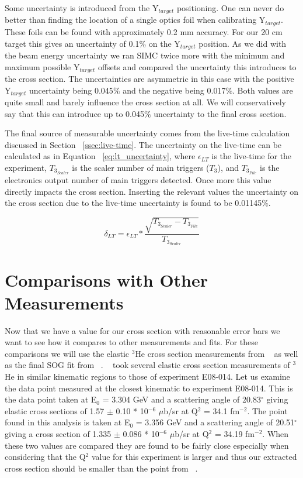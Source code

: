 Some uncertainty is introduced from the Y$_{target}$ positioning. One can never do better than finding the location of a single optics foil when calibrating Y$_{target}$. These foils can be found with approximately 0.2 mm accuracy. For our 20 cm target this gives an uncertainty of 0.1$\%$ on the Y$_{target}$ position. As we did with the beam energy uncertainty we ran SIMC twice more with the minimum and maximum possible Y$_{target}$ offsets and compared the uncertainty this introduces to the cross section. The uncertainties are asymmetric in this case with the positive Y$_{target}$ uncertainty being 0.045$\%$ and the negative being 0.017$\%$. Both values are quite small and barely influence the cross section at all. We will conservatively say that this can introduce up to 0.045$\%$ uncertainty to the final cross section. 

The final source of measurable uncertainty comes from the live-time calculation discussed in Section ~\ref{ssec:live-time}. The uncertainty on the live-time can be calculated as in Equation ~\ref{eq:lt_uncertainty}, where $\epsilon_{LT}$ is the live-time for the experiment, $T_{3_{Scaler}}$ is the scaler number of main triggers ($T_3$), and $T_{3_{File}}$ is the electronics output number of main triggers detected. Once more this value directly impacts the cross section. Inserting the relevant values the uncertainty on the cross section due to the live-time uncertainty is found to be 0.01145$\%$.

\begin{equation} \label{eq:lt_uncertainty}
	\delta_{LT} = \epsilon_{LT} * \frac{\sqrt{T_{3_{Scaler}}-T_{3_{File}}}}{T_{3_{Scaler}}}
\end{equation}

\section{Comparisons with Other Measurements}
\label{sec:comparisons}

Now that we have a value for our cross section with reasonable error bars we want to see how it compares to other measurements and fits. For these comparisons we will use the elastic $^3$He cross section measurements from ~\cite{Article:Alex} as well as the final SOG fit from ~\cite{Article:Amroun}. ~\cite{Article:Alex} took several elastic cross section measurements of $^3$He in similar kinematic regions to those of experiment E08-014. Let us examine the data point measured at the closest kinematic to experiment E08-014. This is the data point taken at E$_0$ = 3.304 GeV and a scattering angle of 20.83$^{\circ}$ giving elastic cross sections of 1.57 $\pm$ 0.10 * 10$^{-6}$ $\mu$b/sr at Q$^2$ = 34.1 fm$^{-2}$. The point found in this analysis is taken at E$_0$ = 3.356 GeV and a scattering angle of 20.51$^{\circ}$ giving a cross section of 1.335 $\pm$ 0.086 * 10$^{-6}$ $\mu$b/sr at Q$^2$ = 34.19 fm$^{-2}$. When these two values are compared they are found to be fairly close especially when considering that the Q$^2$ value for this experiment is larger and thus our extracted cross section should be smaller than the point from ~\cite{Article:Alex}.

